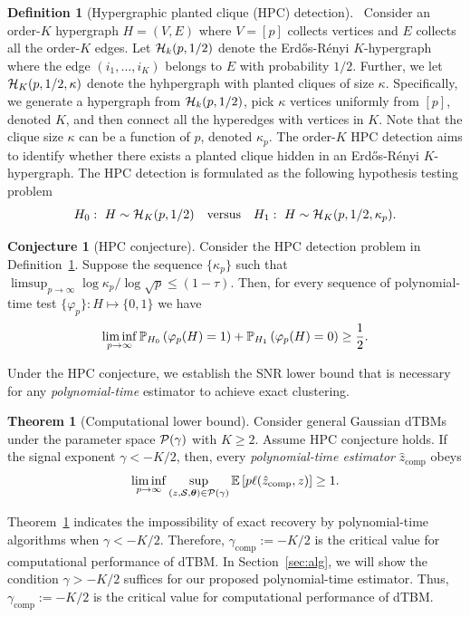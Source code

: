 \documentclass[lettersize,onecolumn,journal]{IEEEtran}
\theoremstyle{definition}
\newtheorem{thm}{Theorem}
\theoremstyle{definition}
\newtheorem{defn}{Definition}
\newtheorem{conjecture}{Conjecture}
\newcommand{\of}[1]{\left(#1\right)}
\begin{document}
\begin{defn}[Hypergraphic planted clique (HPC) detection]~\label{def:HPC} Consider an order-$K$ hypergraph $H = (V,E)$ where $V = [p]$ collects vertices and $E$ collects all the order-$K$ edges. Let $\mathcal{H}_k(p, 1/2)$ denote the Erd\H{o}s-R\'{e}nyi $K$-hypergraph where the edge $(i_1,\ldots, i_K)$ belongs to $E$ with probability $1/2$. Further, we let $\mathcal{H}_K(p, 1/2, \kappa)$ denote the hyhpergraph with planted cliques of size $\kappa$. Specifically, we generate a hypergraph from $\mathcal{H}_k(p, 1/2)$, pick $\kappa$ vertices uniformly from $[p]$, denoted $K$, and then connect all the hyperedges with vertices in $K$. Note that the clique size $\kappa$ can be a function of $p$, denoted $\kappa_p$. The order-$K$ HPC detection aims to identify whether there exists a planted clique hidden in an Erd\H{o}s-R\'{e}nyi $K$-hypergraph. The HPC detection is formulated as the following hypothesis testing problem
\begin{equation}
    H_0:\ H \sim \mathcal{H}_K(p,1/2) \quad \text{versus} \quad H_1: \ H \sim \mathcal{H}_K(p,1/2, \kappa_p).
\end{equation}
\end{defn}

\begin{conjecture}[HPC conjecture]\label{hypo:HPC} Consider the HPC detection problem in Definition~\ref{def:HPC}. Suppose the sequence $\{\kappa_p\}$ such that $\limsup_{p \rightarrow \infty} \log \kappa_p/ \log \sqrt{p} \leq (1 - \tau)$. Then, for every sequence of polynomial-time test $\{ \varphi_p\}: H \mapsto \{0,1\}$ we have 
\begin{equation}
    \liminf_{p \rightarrow \infty} \bbP_{H_0} \of{ \varphi_p(H) =1 } +  \bbP_{H_1} \of{ \varphi_p(H) =0} \geq \frac{1}{2}.
\end{equation}
\end{conjecture}

Under the HPC conjecture, we establish the SNR lower bound that is necessary for any \emph{polynomial-time} estimator to achieve exact clustering.

\begin{thm}[Computational lower bound]\label{thm:comp} Consider general Gaussian dTBMs under the parameter space $\mathcal{P}(\gamma)$ with $K\geq 2$. Assume HPC conjecture holds. If the signal exponent $\gamma < -K/2$, then, every \emph{polynomial-time estimator} $\hat z_{\text{comp}}$ obeys
\begin{align}
   \liminf_{p\to \infty}\sup_{(z, \mathcal{S}, \boldsymbol{\theta}) \in \mathcal{P}(\gamma)}  \mathbb{E} \left[ p\ell(\hat z_{\text{comp}}, z) \right]\geq 1.
\end{align}
\end{thm}
Theorem~\ref{thm:comp} indicates the impossibility of exact recovery by polynomial-time algorithms when $\gamma < -K/2$.  Therefore, $\gamma_{\text{comp}}:=-K/2$ is the critical value for computational performance of dTBM.  In Section~\ref{sec:alg}, we will show the condition $\gamma> -K/2$ suffices for our proposed polynomial-time estimator. Thus, $\gamma_{\text{comp}}:=-K/2$ is the critical value for computational performance of dTBM.  
\end{document}
